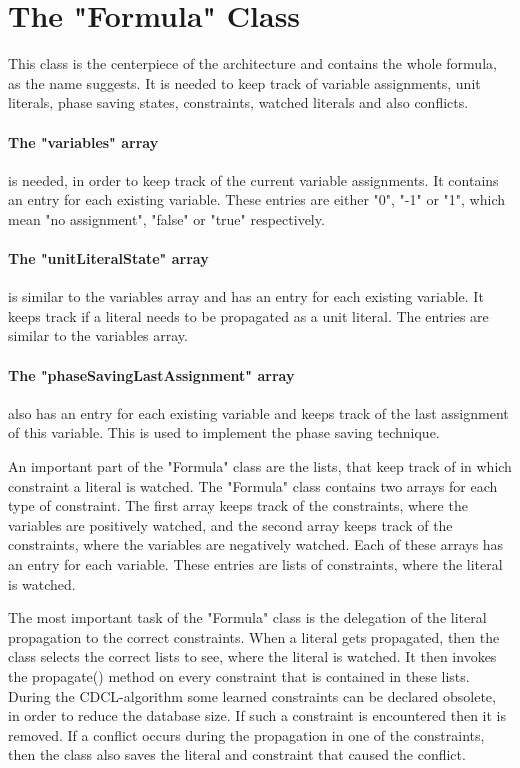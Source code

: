 \section{The "Formula" Class}

This class is the centerpiece of the architecture and contains the whole formula, as the name suggests. It is needed to keep track of variable assignments, unit literals, phase saving states, constraints, watched literals and also conflicts.
\paragraph{The "variables" array} is needed, in order to keep track of the current variable assignments. It contains an entry for each existing variable. These entries are either "0", "-1" or "1", which mean "no assignment", "false" or "true" respectively.
\paragraph{The "unitLiteralState" array} is similar to the variables array and has an entry for each existing variable. It keeps track if a literal needs to be propagated as a unit literal. The entries are similar to the variables array.
\paragraph{The "phaseSavingLastAssignment" array} also has an entry for each existing variable and keeps track of the last assignment of this variable. This is used to implement the phase saving technique.
\par
An important part of the "Formula" class are the lists, that keep track of in which constraint a literal is watched. The "Formula" class contains two arrays for each type of constraint. The first array keeps track of the constraints, where the variables are positively watched, and the second array keeps track of the constraints, where the variables are negatively watched. Each of these arrays has an entry for each variable. These entries are lists of constraints, where the literal is watched.
\par
The most important task of the "Formula" class is the delegation of the literal propagation to the correct constraints. When a literal gets propagated, then the class selects the correct lists to see, where the literal is watched. It then invokes the propagate() method on every constraint that is contained in these lists. During the CDCL-algorithm some learned constraints can be declared obsolete, in order to reduce the database size. If such a constraint is encountered then it is removed. If a conflict occurs during the propagation in one of the constraints, then the class also saves the literal and constraint that caused the conflict.

